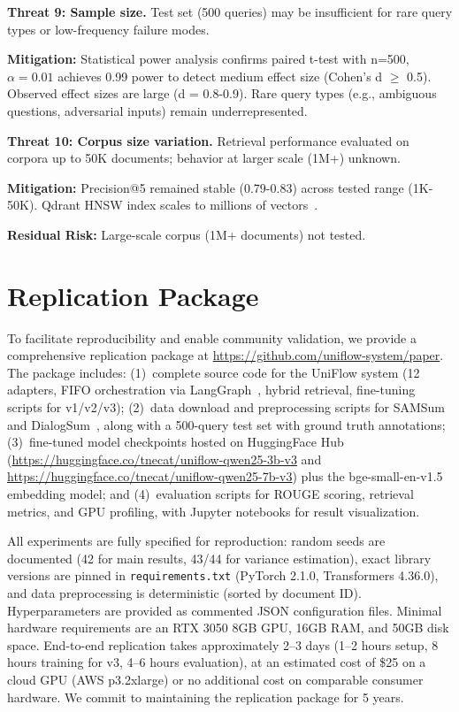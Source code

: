 \documentclass[pdflatex,sn-basic]{sn-jnl}
\begin{document}
\noindent
\textbf{Threat 9: Sample size.} 
Test set (500 queries) may be insufficient for rare query types or low-frequency failure modes.

\noindent
\textbf{Mitigation:} 
Statistical power analysis confirms paired t-test with n=500, $\alpha=0.01$ achieves 0.99 power to detect medium effect size (Cohen's d $\geq$ 0.5). Observed effect sizes are large (d = 0.8-0.9). Rare query types (e.g., ambiguous questions, adversarial inputs) remain underrepresented.

\noindent
\textbf{Threat 10: Corpus size variation.} 
Retrieval performance evaluated on corpora up to 50K documents; behavior at larger scale (1M+) unknown.

\noindent
\textbf{Mitigation:} 
Precision@5 remained stable (0.79-0.83) across tested range (1K-50K). Qdrant HNSW index scales to millions of vectors~\citep{qdrant2023}.

\noindent
\textbf{Residual Risk:} 
Large-scale corpus (1M+ documents) not tested.

\section{Replication Package}
\label{sec:replication}

To facilitate reproducibility and enable community validation, we provide a comprehensive replication package at \url{https://github.com/uniflow-system/paper}. The package includes: (1)~complete source code for the UniFlow system (12 adapters, FIFO orchestration via LangGraph~\citep{langgraph2024}, hybrid retrieval, fine-tuning scripts for v1/v2/v3); (2)~data download and preprocessing scripts for SAMSum~\citep{gliwa2019samsum} and DialogSum~\citep{chen2021dialogsum}, along with a 500-query test set with ground truth annotations; (3)~fine-tuned model checkpoints hosted on HuggingFace Hub (\url{https://huggingface.co/tnecat/uniflow-qwen25-3b-v3} and \url{https://huggingface.co/tnecat/uniflow-qwen25-7b-v3}) plus the bge-small-en-v1.5~\citep{bge2023} embedding model; and (4)~evaluation scripts for ROUGE scoring, retrieval metrics, and GPU profiling, with Jupyter notebooks for result visualization.

All experiments are fully specified for reproduction: random seeds are documented (42 for main results, 43/44 for variance estimation), exact library versions are pinned in \texttt{requirements.txt} (PyTorch 2.1.0, Transformers 4.36.0), and data preprocessing is deterministic (sorted by document ID). Hyperparameters are provided as commented JSON configuration files. Minimal hardware requirements are an RTX 3050 8GB GPU, 16GB RAM, and 50GB disk space. End-to-end replication takes approximately 2--3 days (1--2 hours setup, 8 hours training for v3, 4--6 hours evaluation), at an estimated cost of \$25 on a cloud GPU (AWS p3.2xlarge) or no additional cost on comparable consumer hardware. We commit to maintaining the replication package for 5 years.
\end{document}
